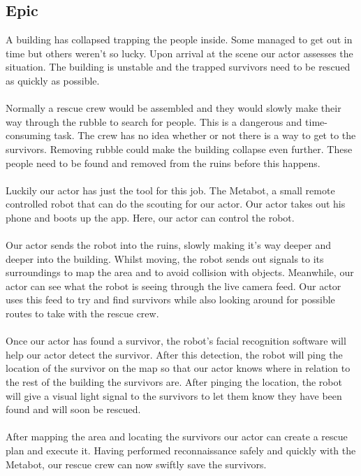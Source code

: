 \documentclass[12pt]{article}
\begin{document}
	 \subsection{Epic}
	 A building has collapsed trapping the people inside. Some managed to get out in time but others weren't so lucky. Upon arrival at the scene our actor assesses the situation. The building is unstable and the trapped survivors need to be rescued as quickly as possible.\\
	 \\Normally a rescue crew would be assembled and they would slowly make their way through the rubble to search for people. This is a dangerous and time-consuming task. The crew has no idea whether or not there is a way to get to the survivors. Removing rubble could make the building collapse even further. These people need to be found and removed from the ruins before this happens.\\
	 \\Luckily our actor has just the tool for this job. The Metabot, a small remote controlled robot that can do the scouting for our actor. Our actor takes out his phone and boots up the app. Here, our actor can control the robot.\\
	 \\Our actor sends the robot into the ruins, slowly making it's way deeper and deeper into the building. Whilst moving, the robot sends out signals to its surroundings to map the area and to avoid collision with objects. Meanwhile, our actor can see what the robot is seeing through the live camera feed. Our actor uses this feed to try and find survivors while also looking around for possible routes to take with the rescue crew.\\
	 \\Once our actor has found a survivor, the robot's facial recognition software will help our actor detect the survivor. After this detection, the robot will ping the location of the survivor on the map so that our actor knows where in relation to the rest of the building the survivors are. After pinging the location, the robot will give a visual light signal to the survivors to let them know they have been found and will soon be rescued.\\
	 \\After mapping the area and locating the survivors our actor can create a rescue plan and execute it. Having performed reconnaissance safely and quickly with the Metabot, our rescue crew can now swiftly save the survivors. 
	 \newpage
\end{document}

